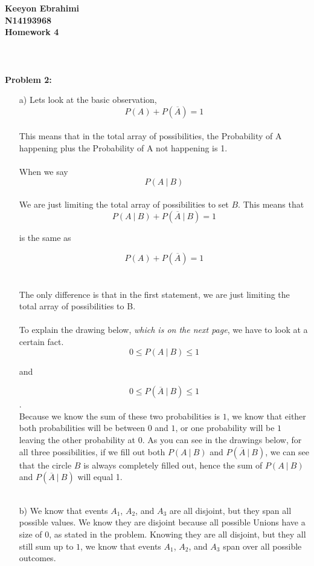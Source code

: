 \documentclass[11pt]{article}
\begin{document}
\textbf{Keeyon Ebrahimi}\\
\textbf{N14193968}\\
\textbf{Homework 4}\\
\\ \\ \\
\textbf{Problem 2:}\\
\begin{enumerate}
\item[a) ] Lets look at the basic observation, $$P(A) + P(\overline{A}) = 1$$\\
This means that in the total array of possibilities, the Probability of A happening plus the Probability of A not happening is 1.\\ \\
When we say $$P(A\ |\ B)$$ \\ We are just limiting the total array of possibilities to set $B$.
This means that $$P(A\ |\ B) + P(\overline{A}\ |\ B) = 1$$
\begin{center}
 is the same as 
\end{center}
$$P(A) + P(\overline{A}) = 1$$ \\ \\
The only difference is that in the first statement, we are just limiting the total array of possibilities to B. \\ \\
To explain the drawing below, \textit{which is on the next page}, we have to look at a certain fact.
$$0 \leq P(A\ |\ B) \leq 1$$ 
\begin{center}
and 
\end{center}
$$0 \leq P(\overline{A}\ |\ B) \leq 1$$.
\\ Because we know the sum of these two probabilities is $1$, we know that either both probabilities will be between $0$ and $1$, or one probability will be $1$ leaving the other probability at $0$.  As you can see in the drawings below, for all three possibilities, if we fill out both $P(A\ |\ B)$ and $P(\overline{A}\ |\ B)$, we can see that the circle $B$ is always completely filled out, hence the sum of $P(A\ |\ B)$ and $P(\overline{A}\ |\ B)$ will equal 1.\\ \\ 
\newpage
\item[b) ]  We know that events $A_1$, $A_2$, and $A_3$ are all disjoint, but they span all possible values.  We know they are disjoint because all possible Unions have a size of $0$, as stated in the problem.  Knowing they are all disjoint, but they all still sum up to $1$, we know that events $A_1$, $A_2$, and $A_3$ span over all possible outcomes.\\ \\

\end{enumerate}
\end{document}
